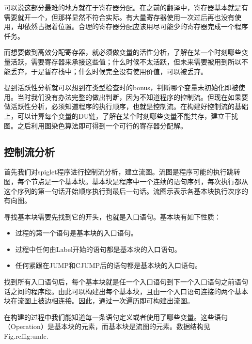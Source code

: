 \documentclass[10pt,a4paper]{article}
\begin{document}
可以说这部分最难的地方就在于寄存器分配。在之前的翻译中，寄存器基本就是有需要就开一个，但那样显然不符合实际。有大量寄存器使用一次过后再也没有使用，却依然占据着位置。合理的寄存器分配应该用尽可能少的寄存器完成一个程序任务。

而想要做到高效分配寄存器，就必须做变量的活性分析，了解在某一个时刻哪些变量活跃，需要寄存器来承接这些值；什么时候不太活跃，但未来需要被用到所以不能丢弃，于是暂存栈中；什么时候完全没有使用价值，可以被丢弃。

提到活跃性分析就可以想到在类型检查时的bonus，判断哪个变量未初始化即被使用。当时我们没有办法完整的做出判断，因为不知道程序的控制流。但现在如果要做活跃性分析，必须知道程序的执行顺序，也就是控制流。在构建好控制流的基础上，可以计算每个变量的DU链，了解在某个时刻哪些变量不能共存，建立干扰图。之后利用图染色算法即可得到一个可行的寄存器分配解。

\subsection{控制流分析}

首先我们对spiglet程序进行控制流分析，建立流图。流图是程序可能的执行跳转图，每个节点是一个基本块。基本块是程序中一个连续的语句序列，每次执行都从这个序列的第一句话开始顺序执行到最后一句话。流图示表示各基本块执行次序的有向图。

寻找基本块需要先找到它的开头，也就是入口语句。基本块有如下性质：
\begin{itemize}
	\item 过程的第一个语句是基本块的入口语句。
	\item 过程中任何由Label开始的语句都是基本块的入口语句。
	\item 任何紧跟在JUMP和CJUMP后的语句都是基本块的入口语句。       
\end{itemize}  

找到所有入口语句后，每个基本块就是任一个入口语句到下一个入口语句之前语句话之间的程序段。由此可以构建出每个基本块，且由一个入口语句连接的两个基本块在流图上被边相连接。因此，通过一次遍历即可构建出流图。

在构建的过程中我们能知道每一条语句定义或者使用了哪些变量。这些语句（Operation）是基本块的元素，而基本块是流图的元素。数据结构见Fig.ref{fig:umlc}.
\end{document}
